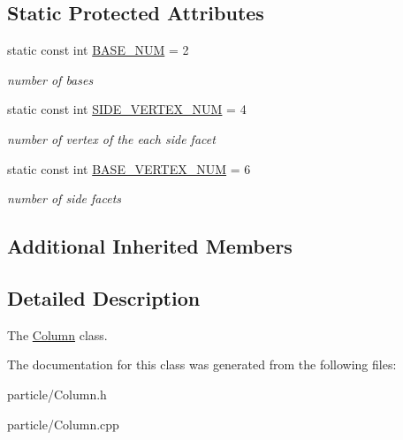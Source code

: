 \subsection*{Static Protected Attributes}
\begin{DoxyCompactItemize}
\item 
\mbox{\label{class_column_a5988fac458953d180b4dcb1a5d2826fa}} 
static const int \mbox{\hyperlink{class_column_a5988fac458953d180b4dcb1a5d2826fa}{B\+A\+S\+E\+\_\+\+N\+UM}} = 2
\begin{DoxyCompactList}\small\item\em number of bases \end{DoxyCompactList}\item 
\mbox{\label{class_column_aa3e3e5d6543b7e34191914ecdd7368bd}} 
static const int \mbox{\hyperlink{class_column_aa3e3e5d6543b7e34191914ecdd7368bd}{S\+I\+D\+E\+\_\+\+V\+E\+R\+T\+E\+X\+\_\+\+N\+UM}} = 4
\begin{DoxyCompactList}\small\item\em number of vertex of the each side facet \end{DoxyCompactList}\item 
\mbox{\label{class_column_a54b8114ca0318ba212dfe2bda99e0918}} 
static const int \mbox{\hyperlink{class_column_a54b8114ca0318ba212dfe2bda99e0918}{B\+A\+S\+E\+\_\+\+V\+E\+R\+T\+E\+X\+\_\+\+N\+UM}} = 6
\begin{DoxyCompactList}\small\item\em number of side facets \end{DoxyCompactList}\end{DoxyCompactItemize}
\subsection*{Additional Inherited Members}


\subsection{Detailed Description}
The \mbox{\hyperlink{class_column}{Column}} class. 

The documentation for this class was generated from the following files\+:\begin{DoxyCompactItemize}
\item 
particle/Column.\+h\item 
particle/Column.\+cpp\end{DoxyCompactItemize}
